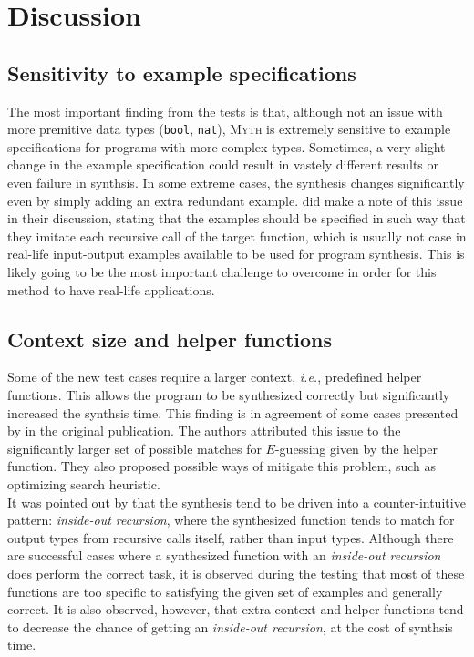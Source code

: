 \documentclass[preprint, 11pt]{sigplanconf}
\begin{document}
\section{Discussion}\label{sec-disc}

\subsection{Sensitivity to example specifications}\label{sec-disc-sens}
The most important finding from the tests is that, although not an issue with more premitive data types (\texttt{bool}, \texttt{nat}), \textsc{Myth} is extremely sensitive to example specifications for programs with more complex types. Sometimes, a very slight change in the example specification could result in vastely different results or even failure in synthsis. In some extreme cases, the synthesis changes significantly even by simply adding an extra redundant example. \citet{osera2015type} did make a note of this issue in their discussion, stating that the examples should be specified in such way that they imitate each recursive call of the target function, which is usually not case in real-life input-output examples available to be used for program synthesis. This is likely going to be the most important challenge to overcome in order for this method to have real-life applications.\\

\subsection{Context size and helper functions}\label{sec-disc-cont}
Some of the new test cases require a larger context, \emph{i.e.}, predefined helper functions. This allows the program to be synthesized correctly but significantly increased the synthsis time. This finding is in agreement of some cases presented by \citet{osera2015type} in the original publication. The authors attributed this issue to the significantly larger set of possible matches for $E$-guessing given by the helper function. They also proposed possible ways of mitigate this problem, such as optimizing search heuristic.\\

It was pointed out by \citet{osera2015type} that the synthesis tend to be driven into a counter-intuitive pattern: \emph{inside-out recursion}, where the synthesized function tends to match for output types from recursive calls itself, rather than input types. Although there are successful cases where a synthesized function with an \emph{inside-out recursion} does perform the correct task, it is observed during the testing that most of these functions are too specific to satisfying the given set of examples and generally correct. It is also observed, however, that extra context and helper functions tend to decrease the chance of getting an \emph{inside-out recursion}, at the cost of synthsis time.\\
\end{document}
